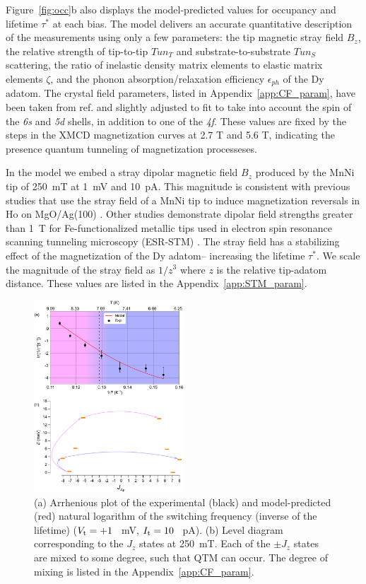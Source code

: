 \documentclass[
reprint,amsmath,amssymb,aps]{revtex4-2}
\begin{document}
Figure~\ref{fig:occ}b also displays the model-predicted values for occupancy and lifetime $\tau^*$ at each bias. The model delivers an accurate quantitative description of the measurements using only a few parameters: the tip magnetic stray field $B_{z}$, the relative strength of tip-to-tip $Tun_{T}$ and substrate-to-substrate $Tun_{S}$ scattering, the ratio of inelastic density matrix elements to elastic matrix elements $\zeta$, and the phonon absorption/relaxation efficiency $\epsilon_{ph}$ of the Dy adatom. The crystal field parameters, listed in Appendix~\ref{app:CF_param}, have been taken from ref.\citep{baltic2018} and slightly adjusted to fit to take into account the spin of the \textit{6s} and \textit{5d} shells, in addition to one of the \textit{4f}. These values are fixed by the steps in the XMCD magnetization curves at 2.7 T and 5.6 T, indicating the presence quantum tunneling of magnetization processeses. \par
 
In the model we embed a stray dipolar magnetic field $B_{z}$ produced by the MnNi tip of 250~mT at 1~mV and 10~pA. This magnitude is consistent with previous studies that use the stray field of a MnNi tip to induce magnetization reversals in Ho on MgO/Ag(100) \citep{Forrester2019}. Other studies demonstrate dipolar field strengths greater than 1~T for Fe-functionalized metallic tips used in electron spin resonance scanning tunneling microscopy (ESR-STM) \citep{yang2019}. The stray field has a stabilizing effect of the magnetization of the Dy adatom-- increasing the lifetime $\tau^*$. We scale the magnitude of the stray field as $1/z^{3}$ where $z$ is the relative tip-adatom distance. These values are listed in the Appendix~\ref{app:STM_param}.\par 

\begin{figure}[H]
\includegraphics[width=0.5\textwidth]{Fig2_250mT_true.pdf}
\caption{(a) Arrhenious plot of the experimental (black) and model-predicted (red) natural logarithm of the switching frequency (inverse of the lifetime) ($V_{\rm t} = +1$ ~mV, $I_{\rm t} = 10$ ~pA). (b) Level diagram corresponding to the $J_{z}$ states at 250~mT. Each of the $\pm J_{z}$ states are mixed to some degree, such that QTM can occur. The degree of mixing is listed in the Appendix~\ref{app:CF_param}. 
\label{fig:arr+diag}}
\end{figure}
\end{document}
